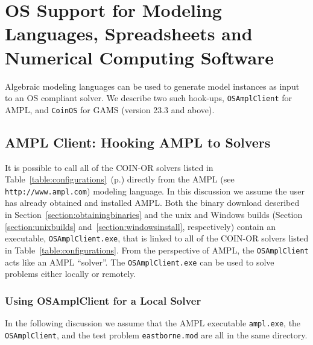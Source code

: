 


\section{OS Support for Modeling Languages, Spreadsheets and Numerical Computing Software}\label{section:modellang}

Algebraic modeling languages can be used to generate model instances as input to an OS compliant solver.
We describe two such hook-ups, {\tt OSAmplClient} for AMPL, and {\tt CoinOS} for GAMS (version 23.3 and above).


\subsection{AMPL Client:  Hooking AMPL to Solvers}\label{section:amplclient}





It is possible to call all of the COIN-OR solvers listed in %
Table~\ref{table:configurations}~(p.\pageref{table:configurations})
directly from the  AMPL (see {\tt http://www.ampl.com}) modeling language.  In this discussion we assume 
the user has already obtained and installed AMPL.  
Both the binary download described in Section~\ref{section:obtainingbinaries}
and the unix and Windows builds (Section \ref{section:unixbuilds}
and~\ref{section:windowsinstall}, respectively) contain
an executable, {\tt OSAmplClient.exe},
that is linked to all of the COIN-OR solvers  listed in Table~\ref{table:configurations}. %
From the  perspective of AMPL, the   {\tt OSAmplClient} acts like an AMPL ``solver''.    
The {\tt OSAmplClient.exe}   can be used to solve problems either locally or remotely.   


\subsubsection{Using OSAmplClient for a Local Solver}\label{section:localampl}

In the following discussion we assume that the AMPL executable {\tt ampl.exe}, the {\tt OSAmplClient},  
and the test problem {\tt  eastborne.mod}
 are all in the same directory.  

